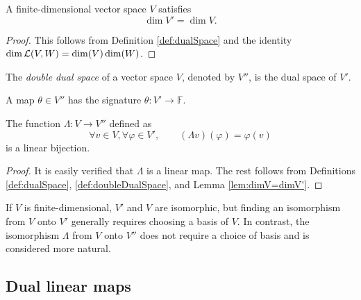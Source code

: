 \begin{lem}
  \label{lem:dimV=dimV'}
  A finite-dimensional vector space $V$ satisfies
  \begin{equation}
    \label{eq:dimV=dimV'}
     \dim V' = \dim V.
  \end{equation}
\end{lem}
\begin{proof}
  This follows from Definition \ref{def:dualSpace}
  and the identity
  $\dim {\cal L}(V,W) = \dim(V) \dim(W)$.
\end{proof}

\begin{defn}
  \label{def:doubleDualSpace}
  The \emph{double dual space} of a vector space $V$,
   denoted by $V''$, 
   is the dual space of $V'$.
\end{defn}

\begin{rem}
  A map $\theta\in V''$ has the signature
   $\theta: V'\rightarrow \mathbb{F}$.
\end{rem}

\begin{lem}
  \label{lem:dualDualAuxFunc}
  The function $\Lambda: V\rightarrow V''$
   defined as
   \begin{equation}
     \label{eq:dualDualAuxFunc}
     \forall v\in V, \forall \varphi\in V',\qquad
     (\Lambda v) (\varphi) = \varphi(v)
   \end{equation}
   is a linear bijection.
\end{lem}
\begin{proof}
  It is easily verified that
   $\Lambda$ is a linear map.
  The rest follows from
   Definitions \ref{def:dualSpace}, \ref{def:doubleDualSpace},
   and Lemma \ref{lem:dimV=dimV'}.
\end{proof}

\begin{rem}
 If $V$ is finite-dimensional,
  $V'$ and $V$ are isomorphic,
  but finding an isomorphism from $V$ onto $V'$
  generally requires choosing a basis of $V$.
 In contrast, the isomorphism $\Lambda$ from $V$ onto $V''$
  does not require a choice of basis and
  is considered more natural.  
\end{rem}


\subsection{Dual linear maps}

